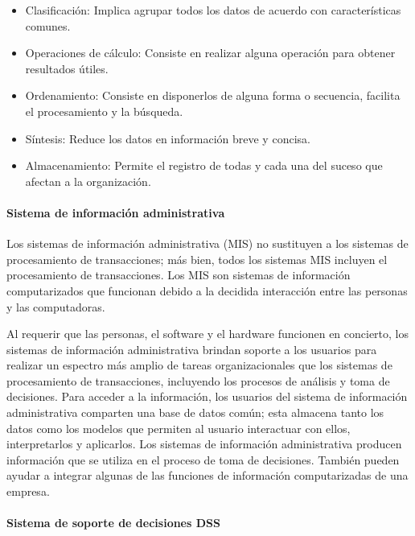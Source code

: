 \begin{itemize}
\item Clasificación: Implica agrupar todos los datos de acuerdo con características comunes.
\item Operaciones de cálculo: Consiste en realizar alguna operación para obtener resultados útiles.  
\item Ordenamiento: Consiste en disponerlos de alguna forma o secuencia, facilita el procesamiento y la búsqueda.  
\item Síntesis: Reduce los datos en información breve y concisa. 
\item Almacenamiento: Permite el registro de todas y cada una del suceso que afectan a la organización.

\end{itemize}

\paragraph{Sistema de información administrativa}

Los sistemas de información administrativa (MIS) no sustituyen a los sistemas de procesamiento de transacciones; más bien, todos los sistemas MIS incluyen el procesamiento de transacciones\cite{kendall2005analisis}. Los MIS son sistemas de información computarizados que funcionan debido a la decidida interacción entre las personas y las computadoras.

Al requerir que las personas, el software y el hardware funcionen en concierto, los sistemas de información administrativa brindan soporte a los usuarios para realizar un espectro más amplio de tareas organizacionales que los sistemas de procesamiento de transacciones, incluyendo los procesos de análisis y toma de decisiones. Para acceder a la información, los usuarios del sistema de información administrativa comparten una base de datos común; esta almacena tanto los datos como los modelos que permiten al usuario interactuar con ellos, interpretarlos y aplicarlos. Los sistemas de información administrativa producen información que se utiliza en el proceso de toma de decisiones. También pueden ayudar a integrar algunas de las funciones de información computarizadas de una empresa. 

\paragraph{Sistema de soporte de decisiones DSS}

